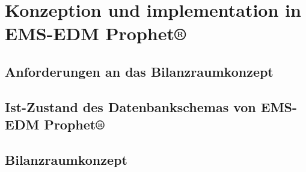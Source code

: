 \documentclass[a4paper,10pt,twoside]{report}
\begin{document}
\chapter{Konzeption und implementation in EMS-EDM Prophet®}
\section{Anforderungen an das Bilanzraumkonzept}



\section{Ist-Zustand des Datenbankschemas von EMS-EDM Prophet®}



\section{Bilanzraumkonzept}






\end{document}
